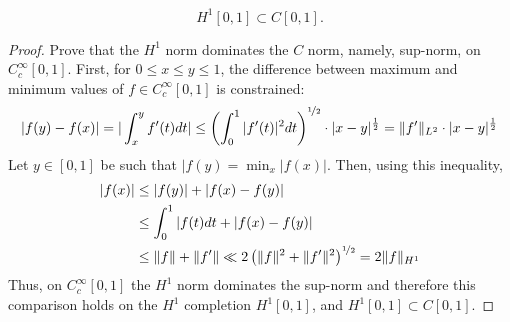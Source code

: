 \begin{theorem} %
	\[ H^{1}[0, 1] \subset C[0, 1]. \]
\begin{proof} %
Prove that the $H^{1}$ norm dominates the $C$ norm, namely, sup-norm, on $C_{c}^{\infty}[0, 1]$. First, for $0 \leq x \leq y \leq 1$, the difference between maximum and minimum values of $f \in C_{c}^{\infty}[0, 1]$ is constrained:
	\[ |f(y) - f(x)| = | \int_{x}^{y} f'(t) dt | \leq \left( \int_{0}^{1} |f'(t)|^{2} dt \right)^{\nicefrac{1}{2}} \cdot |x-y|^{\frac{1}{2}} = \|f'\|_{L^2} \cdot |x - y|^{\frac{1}{2}} \]
	Let $y \in [0, 1]$ be such that $|f(y) = \min_{x}|f(x)|$. Then, using this inequality,
	\begin{align*}
		|f(x)| & \leq |f(y)| + |f(x) - f(y)| \\
			   & \leq \int_{0}^{1} |f(t) dt + |f(x) - f(y)| \\
			   & \leq \| f \| + \| f' \| \ll 2 \left(  \| f \|^{2} + \| f' \|^{2} \right)^{\nicefrac{1}{2}} = 2 \|f\|_{H^{1}}
	\end{align*}
	Thus, on $C_{c}^{\infty}[0,1]$ the $H^{1}$ norm dominates the sup-norm and therefore this comparison holds on the $H^{1}$ completion $H^{1}[0,1]$, and $H^{1}[0,1] \subset C[0,1]$.
\end{proof}
\end{theorem}